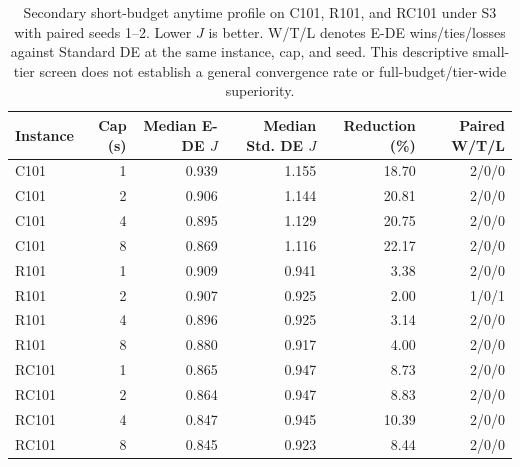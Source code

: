 \begin{table}[H]
\centering
\small
\setlength{\tabcolsep}{4pt}
\renewcommand{\arraystretch}{1.12}
\begin{tabular}{lrrrrr}
\toprule
Instance & Cap (s) & Median E-DE $J$ & Median Std. DE $J$ & Reduction (\%) & Paired W/T/L \\
\midrule
C101 & 1 & 0.939 & 1.155 & 18.70 & 2/0/0 \\
C101 & 2 & 0.906 & 1.144 & 20.81 & 2/0/0 \\
C101 & 4 & 0.895 & 1.129 & 20.75 & 2/0/0 \\
C101 & 8 & 0.869 & 1.116 & 22.17 & 2/0/0 \\
R101 & 1 & 0.909 & 0.941 & 3.38 & 2/0/0 \\
R101 & 2 & 0.907 & 0.925 & 2.00 & 1/0/1 \\
R101 & 4 & 0.896 & 0.925 & 3.14 & 2/0/0 \\
R101 & 8 & 0.880 & 0.917 & 4.00 & 2/0/0 \\
RC101 & 1 & 0.865 & 0.947 & 8.73 & 2/0/0 \\
RC101 & 2 & 0.864 & 0.947 & 8.83 & 2/0/0 \\
RC101 & 4 & 0.847 & 0.945 & 10.39 & 2/0/0 \\
RC101 & 8 & 0.845 & 0.923 & 8.44 & 2/0/0 \\
\bottomrule
\end{tabular}
\caption{Secondary short-budget anytime profile on C101, R101, and RC101 under S3 with paired seeds 1--2. Lower $J$ is better. W/T/L denotes E-DE wins/ties/losses against Standard DE at the same instance, cap, and seed. This descriptive small-tier screen does not establish a general convergence rate or full-budget/tier-wide superiority.}
\label{tab:anytime_profile_secondary}
\end{table}
